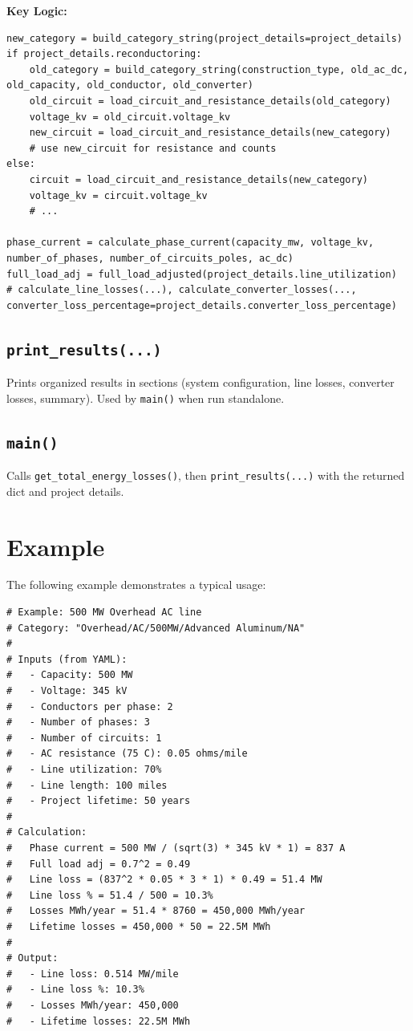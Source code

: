 \documentclass[ctcc_full_documentation.tex]{subfiles}
\begin{document}
\textbf{Key Logic:}
\begin{lstlisting}
new_category = build_category_string(project_details=project_details)
if project_details.reconductoring:
    old_category = build_category_string(construction_type, old_ac_dc, old_capacity, old_conductor, old_converter)
    old_circuit = load_circuit_and_resistance_details(old_category)
    voltage_kv = old_circuit.voltage_kv
    new_circuit = load_circuit_and_resistance_details(new_category)
    # use new_circuit for resistance and counts
else:
    circuit = load_circuit_and_resistance_details(new_category)
    voltage_kv = circuit.voltage_kv
    # ...

phase_current = calculate_phase_current(capacity_mw, voltage_kv, number_of_phases, number_of_circuits_poles, ac_dc)
full_load_adj = full_load_adjusted(project_details.line_utilization)
# calculate_line_losses(...), calculate_converter_losses(..., converter_loss_percentage=project_details.converter_loss_percentage)
\end{lstlisting}

\subsection{\texttt{print\_results(...)}}

Prints organized results in sections (system configuration, line losses, converter losses, summary). Used by \texttt{main()} when run standalone.

\subsection{\texttt{main()}}

Calls \texttt{get\_total\_energy\_losses()}, then \texttt{print\_results(...)} with the returned dict and project details.

\section{Example}

The following example demonstrates a typical usage:

\begin{lstlisting}
# Example: 500 MW Overhead AC line
# Category: "Overhead/AC/500MW/Advanced Aluminum/NA"
# 
# Inputs (from YAML):
#   - Capacity: 500 MW
#   - Voltage: 345 kV
#   - Conductors per phase: 2
#   - Number of phases: 3
#   - Number of circuits: 1
#   - AC resistance (75 C): 0.05 ohms/mile
#   - Line utilization: 70%
#   - Line length: 100 miles
#   - Project lifetime: 50 years
#
# Calculation:
#   Phase current = 500 MW / (sqrt(3) * 345 kV * 1) = 837 A
#   Full load adj = 0.7^2 = 0.49
#   Line loss = (837^2 * 0.05 * 3 * 1) * 0.49 = 51.4 MW
#   Line loss % = 51.4 / 500 = 10.3%
#   Losses MWh/year = 51.4 * 8760 = 450,000 MWh/year
#   Lifetime losses = 450,000 * 50 = 22.5M MWh
#
# Output:
#   - Line loss: 0.514 MW/mile
#   - Line loss %: 10.3%
#   - Losses MWh/year: 450,000
#   - Lifetime losses: 22.5M MWh
\end{lstlisting}
\end{document}
